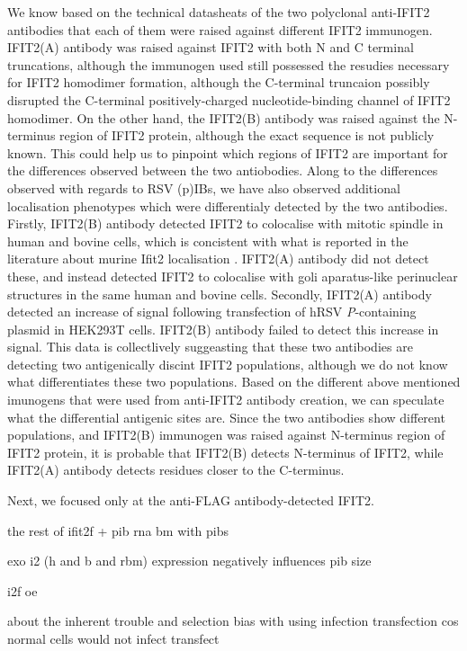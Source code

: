 We know based on the technical datasheats of the two polyclonal anti-IFIT2 antibodies that each of them were raised against different IFIT2 immunogen. IFIT2(A) antibody was raised against IFIT2 with both N and C terminal truncations, although the immunogen used still possessed the resudies necessary for IFIT2 homodimer formation, although the C-terminal truncaion possibly disrupted the C-terminal positively-charged nucleotide-binding channel of IFIT2 homodimer. On the other hand, the IFIT2(B) antibody was raised against the N-terminus region of IFIT2 protein, although the exact sequence is not publicly known. This could help us to pinpoint which regions of IFIT2 are important for the differences observed between the two antiobodies. Along to the differences observed with regards to RSV (p)IBs, we have also observed additional localisation phenotypes which were differentialy detected by the two antibodies. Firstly, IFIT2(B) antibody detected IFIT2 to colocalise with mitotic spindle in human and bovine cells, which is concistent with what is reported in the literature about murine Ifit2 localisation \cite{Saha2006IdentificationProtein}. IFIT2(A) antibody did not detect these, and instead detected IFIT2 to colocalise with goli aparatus-like perinuclear structures in the same human and bovine cells. Secondly, IFIT2(A) antibody detected an increase of signal following transfection of hRSV \textit{P}-containing plasmid in HEK293T cells. IFIT2(B) antibody failed to detect this increase in signal. This data is collectlively suggeasting that these two antibodies are detecting two antigenically discint IFIT2 populations, although we do not know what differentiates these two populations. Based on the different above mentioned imunogens that were used from anti-IFIT2 antibody creation, we can speculate what the differential antigenic sites are. Since the two antibodies show different populations, and IFIT2(B) immunogen was raised against N-terminus region of IFIT2 protein, it is probable that IFIT2(B) detects N-terminus of IFIT2, while IFIT2(A) antibody detects residues closer to the C-terminus.

Next, we focused only at the anti-FLAG antibody-detected IFIT2.

the rest of ifit2f + pib
rna bm with pibs 

exo i2 (h and b and rbm) expression negatively influences pib size

i2f oe

about the inherent trouble and selection bias with using infection transfection cos normal cells would not infect transfect

